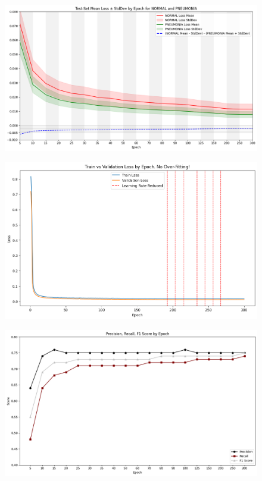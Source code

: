 \documentclass{article}
\begin{document}
\begin{figure}[H]
  \centering
  \includegraphics[width=1\linewidth]{losses_mean_std_by_epoch.png}
\end{figure}

\begin{figure}[H]
  \centering
  \includegraphics[width=1\linewidth]{train_val_loss_by_epoch.png}
\end{figure}

\begin{figure}[H]
  \centering
  \includegraphics[width=1\linewidth]{scores_by_epoch.png}
\end{figure}
\end{document}
